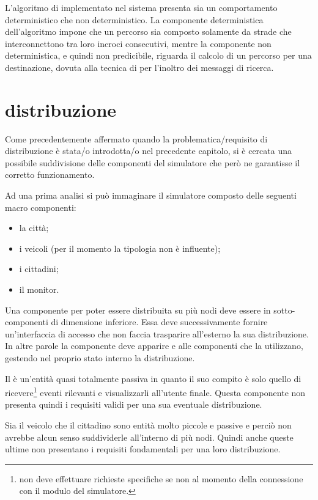 L'algoritmo di  implementato nel sistema presenta sia un comportamento deterministico che non deterministico. La componente deterministica dell'algoritmo impone che un percorso sia composto solamente da strade che interconnettono tra loro incroci consecutivi, mentre la componente non deterministica, e quindi non predicibile, riguarda il calcolo di un percorso per una destinazione, dovuta alla tecnica di  per l'inoltro dei messaggi di ricerca.

\section*{distribuzione}
\label{analisi-della-soluzione-distribuzione}
Come precedentemente affermato quando la problematica/requisito di distribuzione è stata/o introdotta/o nel precedente capitolo, si è cercata una possibile suddivisione delle componenti del simulatore che però ne garantisse il corretto funzionamento.

Ad una prima analisi si può immaginare il simulatore composto delle seguenti macro componenti:

\begin{itemize}
\item{la città;}
\item{i veicoli (per il momento la tipologia non è influente);}
\item{i cittadini;}
\item{il monitor.}
\end{itemize}

Una componente per poter essere distribuita su più nodi deve essere  in sotto-componenti di dimensione inferiore. Essa deve successivamente fornire un'interfaccia di accesso che non faccia trasparire all'esterno la sua distribuzione. In altre parole la componente deve apparire  e  alle componenti che la utilizzano, gestendo nel proprio stato interno la distribuzione.

Il  è un'entità quasi totalmente passiva in quanto il suo compito è solo quello di ricevere\footnote{non deve effettuare richieste specifiche se non al momento della connessione con il modulo  del simulatore.} eventi rilevanti e visualizzarli all'utente finale. Questa componente non presenta quindi i requisiti validi per una sua eventuale distribuzione.

Sia il veicolo che il cittadino sono entità molto piccole e passive e perciò non avrebbe alcun senso suddividerle all'interno di più nodi. Quindi anche queste ultime non presentano i requisiti fondamentali per una loro distribuzione.

